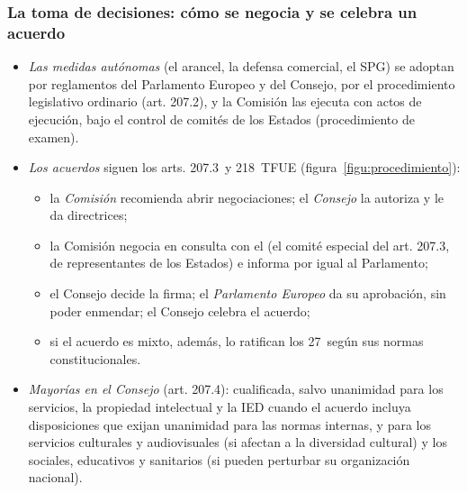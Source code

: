 \documentclass[11pt]{article}
\begin{document}
\subsubsection{La toma de decisiones: cómo se negocia y se celebra un acuerdo}\label{sec:procedimiento}

\begin{itemize}
\item \emph{Las medidas autónomas} (el arancel, la defensa comercial, el SPG) se adoptan por reglamentos del Parlamento Europeo y del Consejo, por el procedimiento legislativo ordinario (art. 207.2), y la Comisión las ejecuta con actos de ejecución, bajo el control de comités de los Estados (procedimiento de examen).
\item \emph{Los acuerdos} siguen los arts. 207.3~y 218~TFUE (figura~\ref{figu:procedimiento}):
  \begin{itemize}
  \item la \emph{Comisión} recomienda abrir negociaciones; el \emph{Consejo} la autoriza y le da directrices;
  \item la Comisión negocia en consulta con el  (el comité especial del art. 207.3, de representantes de los Estados) e informa por igual al Parlamento;
  \item el Consejo decide la firma; el \emph{Parlamento Europeo} da su aprobación, sin poder enmendar; el Consejo celebra el acuerdo;
  \item si el acuerdo es mixto, además, lo ratifican los 27~según sus normas constitucionales.
  \end{itemize}
\item \emph{Mayorías en el Consejo} (art. 207.4): cualificada, salvo unanimidad para los servicios, la propiedad intelectual y la IED cuando el acuerdo incluya disposiciones que exijan unanimidad para las normas internas, y para los servicios culturales y audiovisuales (si afectan a la diversidad cultural) y los sociales, educativos y sanitarios (si pueden perturbar su organización nacional).
\end{itemize}

\begin{infografia}[H]
\centering
\caption{Cómo se negocia y se celebra un acuerdo comercial de la UE (arts. 207~y 218~TFUE)}\label{figu:procedimiento}
\end{infografia}
\end{document}
